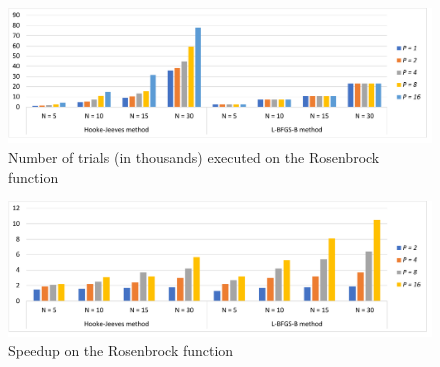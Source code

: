 \documentclass[runningheads]{llncs}
\begin{document}
%

\begin{figure}
\begin{center}
  \includegraphics[width=1.0\linewidth]{RosenbrocNT.pdf}
  \caption{Number of trials (in thousands) executed on the Rosenbrock function}
  \label{fig:RosenbrocNT}  
\end{center}
\end{figure}

\begin{figure}
\begin{center}
  \includegraphics[width=1.0\linewidth]{RosenbrocSpeedup.pdf}
  \caption{Speedup on the Rosenbrock function}
  \label{fig:RosenbrocSpeedup}  
\end{center}
\end{figure}
\end{document}
